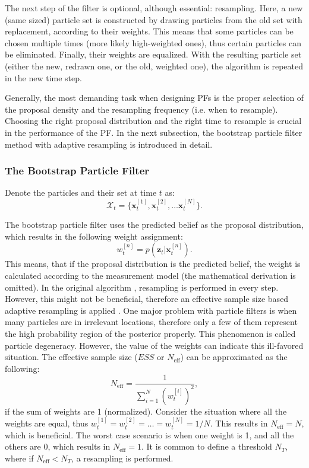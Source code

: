 The next step of the filter is optional, although essential: resampling. Here, a new (same sized) particle set is constructed by drawing particles from the old set with replacement, according to their weights. This means that some  particles can be chosen multiple times (more likely high-weighted ones), thus certain particles can be eliminated. Finally, their weights are equalized. With the resulting particle set (either the new, redrawn one, or the old, weighted one), the algorithm is repeated in the new time step.

Generally, the most demanding task when designing PFs is the proper selection of the proposal density and the resampling frequency (i.e. when to resample). Choosing the right proposal distribution and the right time to resample is crucial in the performance of the PF. In the next subsection, the bootstrap particle filter method with adaptive resampling is introduced in detail.
\subsubsection{The Bootstrap Particle Filter}

Denote the particles and their set at time $t$  as:
\begin{equation}\label{key}
  \mathcal{X}_t = \{\mathbf{x}_t^{[1]},\mathbf{x}_t^{[2]}, \dots \mathbf{x}_t^{[N]}\}.
\end{equation}

The bootstrap particle filter uses the predicted belief as the proposal distribution, which results in the following weight assignment:
\begin{equation}\label{key}
  w_t^{[n]} = p(\mathbf{z}_t|\mathbf{x}_t^{[n]}).
\end{equation}
This means, that  if the proposal distribution is the predicted belief, the weight is calculated according to the measurement model (the mathematical derivation is omitted). In the original algorithm \cite{Gordon1993}, resampling is performed in every step. However, this might not be beneficial, therefore an effective sample size based adaptive resampling is applied \cite{Liu2004}. One major problem with particle filters is when many particles are in irrelevant locations, therefore only a few of them represent the high probability region of the posterior properly. This phenomenon is called particle degeneracy. However, the value of the weights can indicate this ill-favored situation. The effective sample size ($ESS$ or $N_{\mathrm{eff}}$) can be approximated as the following:
\begin{equation}\label{eq:neff}
  N_{\mathrm{eff}} = \frac{1}{\sum_{i = 1}^{N}(w_t^{[i]})^2},
\end{equation}
if the sum of weights are 1 (normalized). Consider the situation where all the weights are equal, thus $w_t^{[1]} = w_t^{[2]} = \dots = w_t^{[N]} = 1/N$. This results in $N_{\mathrm{eff}} = N$, which is beneficial. The worst case scenario is when one weight is 1, and all the others are 0, which results in $N_{\mathrm{eff}} = 1$. It is common to define a threshold $N_{T}$, where if $N_{\mathrm{eff}} < N_T$, a resampling is performed.

